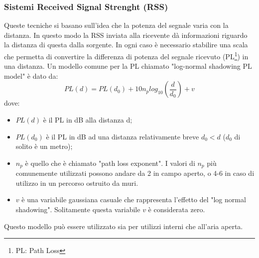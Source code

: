 \subsubsection{Sistemi Received Signal Strenght (RSS)}
Queste tecniche si basano sull'idea che la potenza del segnale varia con la distanza. In questo modo la RSS inviata alla ricevente dà informazioni riguardo la distanza di questa dalla sorgente. In ogni caso è necessario stabilire una scala che permetta di convertire la differenza di potenza del segnale ricevuto (PL\footnote{PL: Path Loss}) in una distanza. Un modello comune per la PL chiamato "log-normal shadowing PL model" è dato da:
 $$ PL\left(d\right) = PL\left(d_0\right) + 10n_plog_{10} \left( \frac{d}{d_0} \right) + v $$
dove:
\begin{itemize}
\item $ PL(d) $ è il PL in dB alla distanza d; 
\item $ PL(d_0) $ è il PL in dB ad una distanza relativamente breve $ d_0 < d $ ($ d_{0} $ di solito è un metro); 
\item $n_p$ è quello che è chiamato "path loss exponent". I valori di $n_p$ più comunemente utilizzati possono andare da 2 in campo aperto, o 4-6 in caso di utilizzo in un percorso ostruito da muri.
\item $v$ è una variabile gaussiana casuale che rappresenta l'effetto del "log normal shadowing". Solitamente questa variabile $v$ è considerata zero. 
\end{itemize}
Questo modello può essere utilizzato sia per utilizzi interni che all'aria aperta. 

